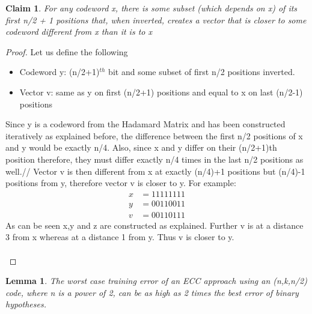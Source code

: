 \documentclass[11pt]{article}
\newtheorem{lemma}[theorem]{Lemma}
\newtheorem{claim}[theorem]{Claim}
\begin{document}
            \begin{claim} 
                    For any codeword x, there is some subset (which depends on x) of its first n/2 + 1 positions that, when inverted, creates a vector that is closer to some codeword different from x than it is to x
            \end{claim}
            \begin{proof}
                Let us define the following
                \begin{itemize}
                    \item Codeword y: (n/2+1)$^{th}$ bit and some subset of first n/2 positions inverted.
                    \item Vector v: same as y on first (n/2+1) positions and equal to x on last (n/2-1) positions
                \end{itemize}
                 Since y is a codeword from the Hadamard Matrix and has been constructed iteratively as explained before, the difference between the first n/2 positions of x and y would be exactly n/4. Also, since x and y differ on their (n/2+1)th position therefore, they must differ exactly n/4 times in the last n/2 positions as well.//
                 Vector v is then different from x at exactly (n/4)+1 positions but (n/4)-1 positions from y, therefore vector v is closer to y. For example:
                 \begin{align*}
                      x & =11111111\\
                      y & =00110011\\
                      v & =00110111 
                 \end{align*}
                 As can be seen x,y and z are constructed as explained. Further v is at a distance 3 from x whereas at a distance 1 from y. Thus v is closer to y.\\\\
            \end{proof}
    \begin{lemma} 
        The worst case training error of an ECC approach using an (n,k,n/2) code, where n is a power of 2, can be as high as 2 times the best error of binary hypotheses.
    \end{lemma}
\end{document}
